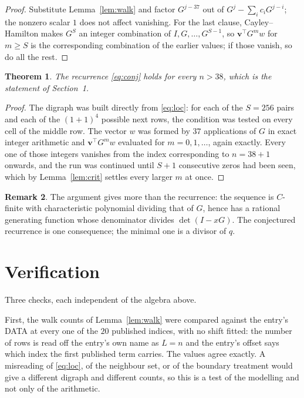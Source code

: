 \documentclass[11pt,a4paper]{article}
\theoremstyle{plain}
\newtheorem{theorem}{Theorem}
\theoremstyle{definition}
\newtheorem{remark}[theorem]{Remark}
\begin{document}
\begin{proof}
Substitute Lemma~\ref{lem:walk} and factor $G^{j-37}$ out of
$G^{j}-\sum_ic_iG^{j-i}$; the nonzero scalar $1$ does not affect
vanishing. For the last clause, Cayley--Hamilton makes $G^{S}$ an integer combination of
$I,G,\dots,G^{S-1}$, so $\mathbf{v}^{\!\top}G^{m}w$ for $m\ge S$ is the corresponding
combination of the earlier values; if those vanish, so do all the rest.
\end{proof}

\begin{theorem}
The recurrence \eqref{eq:conj} holds for every $n>38$, which is the statement of
Section~1.
\end{theorem}

\begin{proof}
The digraph was built directly from \eqref{eq:loc}: for each of the $S=256$ pairs and each
of the $(1+1)^{4}$ possible next rows, the condition was tested on every cell of
the middle row. The vector $w$ was formed by $37$ applications of $G$ in exact integer
arithmetic and $\mathbf{v}^{\!\top}G^{m}w$ evaluated for $m=0,1,\dots$, again exactly.
Every one of those integers vanishes from the index corresponding to $n=38+1$ onwards,
and the run was continued until $S+1$ consecutive zeros had been seen, which by
Lemma~\ref{lem:crit} settles every larger $m$ at once.
\end{proof}

\begin{remark}
The argument gives more than the recurrence: the sequence is $C$-finite with characteristic
polynomial dividing that of $G$, hence has a rational generating function whose denominator
divides $\det(I-xG)$. The conjectured recurrence is one consequence; the minimal one is a
divisor of $q$.
\end{remark}

\section{Verification}

Three checks, each independent of the algebra above.

First, the walk counts of Lemma~\ref{lem:walk} were compared against the entry's DATA at
every one of the $20$ published indices, with no shift fitted: the number of rows is
read off the entry's own name as $L=n$ and the entry's offset says which index the first
published term carries. The values agree exactly. A misreading of \eqref{eq:loc}, of the
neighbour set, or of the boundary treatment would give a different digraph and different
counts, so this is a test of the modelling and not only of the arithmetic.
\end{document}
